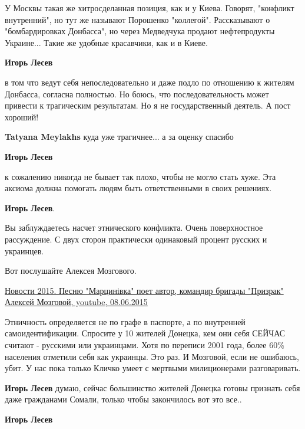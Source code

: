 \begin{itemize}
\begin{itemize} %

У Москвы такая же хитросделанная позиция, как и у Киева. Говорят, "конфликт
внутренний", но тут же называют Порошенко "коллегой". Рассказывают о
"бомбардировках Донбасса", но через Медведчука продают нефтепродукты Украине...
Такие же удобные красавчики, как и в Киеве.


\textbf{Игорь Лесев} 

в том что ведут себя непоследовательно и даже подло по отношению к жителям
Донбасса, согласна полностью. Но боюсь, что последовательность может привести к
трагическим результатам. Но я не государственный деятель. А пост хороший!

\textbf{Tatyana Meylakhs} куда уже трагичнее... а за оценку спасибо

\textbf{Игорь Лесев} 

к сожалению никогда не бывает так плохо, чтобы не могло стать хуже. Эта аксиома
должна помогать людям быть ответственными в своих решениях.

\end{itemize} %

\textbf{Игорь Лесев}.

Вы заблуждаетесь насчет этнического конфликта. Очень поверхностное рассуждение. С
двух сторон практически одинаковый процент русских и украинцев.

Вот послушайте Алексея Мозгового.

\href{https://youtu.be/hEjCho4jz4g}{%
Новости 2015. Песню "Марцинiвка" поет автор, командир бригады "Призрак" Алексей Мозговой, youtube, %
08.06.2015%
}

\begin{itemize} %

Этничность определяется не по графе в паспорте, а по внутренней
самоидентификации. Спросите у 10 жителей Донецка, кем они себя СЕЙЧАС считают -
русскими или украинцами. Хотя по переписи 2001 года, более 60\% населения
отметили себя как украинцы. Это раз. И Мозговой, если не ошибаюсь, убит. У нас
пока только Кличко умеет с мертвыми милиционерами разговаривать.

\textbf{Игорь Лесев} думаю, сейчас большинство жителей Донецка готовы признать себя даже гражданами Сомали, только чтобы закончилось вот это все..

\textbf{Игорь Лесев} 


\end{itemize}
\end{itemize}
